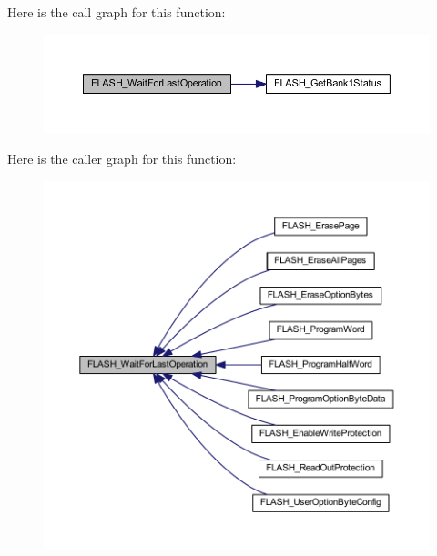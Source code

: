 Here is the call graph for this function\+:
\nopagebreak
\begin{figure}[H]
\begin{center}
\leavevmode
\includegraphics[width=350pt]{group___f_l_a_s_h___private___functions_ga2ad803999ae93ec03700983c59cae264_cgraph}
\end{center}
\end{figure}
Here is the caller graph for this function\+:
\nopagebreak
\begin{figure}[H]
\begin{center}
\leavevmode
\includegraphics[width=350pt]{group___f_l_a_s_h___private___functions_ga2ad803999ae93ec03700983c59cae264_icgraph}
\end{center}
\end{figure}
